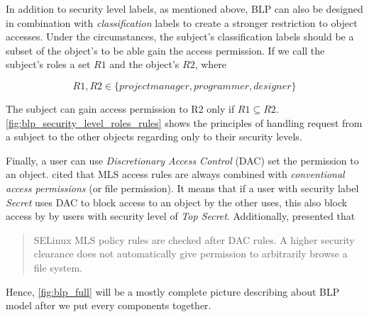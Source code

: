 
In addition to security level labels, as mentioned above, BLP can also be designed in combination with \emph{classification} labels to create a stronger restriction to object accesses.
Under the circumstances, the subject's classification labels should be a subset of the object's to be able gain the access permission.
If we call the subject's roles a set $R1$ and the object's $R2$, where

$$R1, R2 \in \{project manager, programmer, designer\}$$ 

The subject can gain access permission to R2 only if $R1 \subseteq R2$.
\autoref{fig:blp_security_level_roles_rules} shows the principles of handling request from a subject to the other objects regarding only to their security levels.


Finally, a user can use \emph{Discretionary Access Control} (DAC) set the permission to an object.
\cite{centos:2008} cited that MLS access rules are always combined with \emph{conventional access permissions} (or file permission).
It means that if a user with security label \emph{Secret} uses DAC to block access to an object by the other uses, this also block access by by users with security level of \emph{Top Secret}.
Additionally, \cite{bancinco:2015} presented that
\begin{quote}
SELinux MLS policy rules are checked after DAC rules. A higher security clearance does not automatically give permission to arbitrarily browse a file system.
\end{quote}
Hence, \autoref{fig:blp_full} will be a mostly complete picture describing about BLP model after we put every components together.

